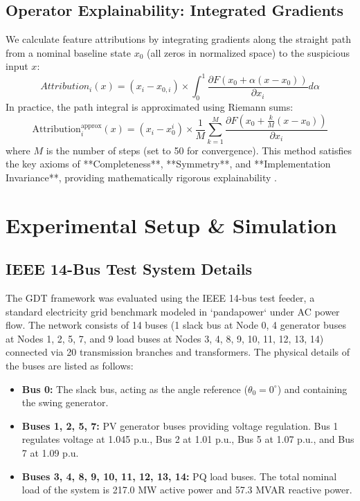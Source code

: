 \documentclass[journal]{IEEEtran}
\begin{document}
\subsection{Operator Explainability: Integrated Gradients}
We calculate feature attributions by integrating gradients along the straight path from a nominal baseline state $x_0$ (all zeros in normalized space) to the suspicious input $x$:
\begin{equation}
Attribution_i(x) = (x_i - x_{0,i}) \times \int_{0}^{1} \frac{\partial F(x_0 + \alpha(x - x_0))}{\partial x_i} d\alpha
\end{equation}
In practice, the path integral is approximated using Riemann sums:
\begin{equation}
\text{Attribution}_i^{\text{approx}}(x) = (x_i - x_0^i) \times \frac{1}{M} \sum_{k=1}^M \frac{\partial F\left(x_0 + \frac{k}{M}(x - x_0)\right)}{\partial x_i}
\end{equation}
where $M$ is the number of steps (set to 50 for convergence). This method satisfies the key axioms of **Completeness**, **Symmetry**, and **Implementation Invariance**, providing mathematically rigorous explainability \cite{b7}.

\section{Experimental Setup \& Simulation}

\subsection{IEEE 14-Bus Test System Details}
The GDT framework was evaluated using the IEEE 14-bus test feeder, a standard electricity grid benchmark modeled in `pandapower` under AC power flow. The network consists of 14 buses (1 slack bus at Node 0, 4 generator buses at Nodes 1, 2, 5, 7, and 9 load buses at Nodes 3, 4, 8, 9, 10, 11, 12, 13, 14) connected via 20 transmission branches and transformers. The physical details of the buses are listed as follows:
\begin{itemize}
    \item \textbf{Bus 0:} The slack bus, acting as the angle reference ($\theta_0 = 0^\circ$) and containing the swing generator.
    \item \textbf{Buses 1, 2, 5, 7:} PV generator buses providing voltage regulation. Bus 1 regulates voltage at 1.045 p.u., Bus 2 at 1.01 p.u., Bus 5 at 1.07 p.u., and Bus 7 at 1.09 p.u.
    \item \textbf{Buses 3, 4, 8, 9, 10, 11, 12, 13, 14:} PQ load buses. The total nominal load of the system is 217.0 MW active power and 57.3 MVAR reactive power.
\end{itemize}
\end{document}

